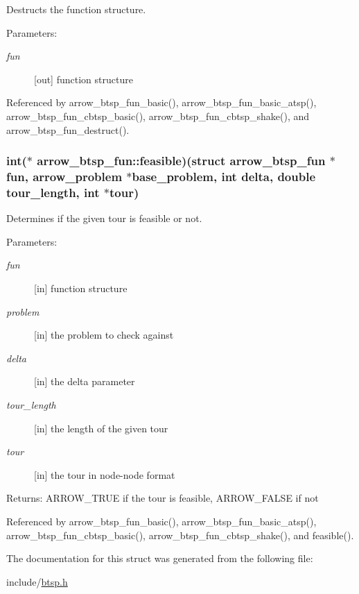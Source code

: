 Destructs the function structure. 

\begin{Desc}
\item[Parameters:]
\begin{description}
\item[{\em fun}]\mbox{[}out\mbox{]} function structure \end{description}
\end{Desc}


Referenced by arrow\_\-btsp\_\-fun\_\-basic(), arrow\_\-btsp\_\-fun\_\-basic\_\-atsp(), arrow\_\-btsp\_\-fun\_\-cbtsp\_\-basic(), arrow\_\-btsp\_\-fun\_\-cbtsp\_\-shake(), and arrow\_\-btsp\_\-fun\_\-destruct().\hypertarget{structarrow__btsp__fun_39eb61a5ad9a5786e773cce4affd2150}{
\subsubsection{\setlength{\rightskip}{0pt plus 5cm}int($\ast$ {\bf arrow\_\-btsp\_\-fun::feasible})(struct {\bf arrow\_\-btsp\_\-fun} $\ast$fun, {\bf arrow\_\-problem} $\ast$base\_\-problem, int delta, double tour\_\-length, int $\ast$tour)}}
\label{structarrow__btsp__fun_39eb61a5ad9a5786e773cce4affd2150}


Determines if the given tour is feasible or not. 

\begin{Desc}
\item[Parameters:]
\begin{description}
\item[{\em fun}]\mbox{[}in\mbox{]} function structure \item[{\em problem}]\mbox{[}in\mbox{]} the problem to check against \item[{\em delta}]\mbox{[}in\mbox{]} the delta parameter \item[{\em tour\_\-length}]\mbox{[}in\mbox{]} the length of the given tour \item[{\em tour}]\mbox{[}in\mbox{]} the tour in node-node format \end{description}
\end{Desc}
\begin{Desc}
\item[Returns:]ARROW\_\-TRUE if the tour is feasible, ARROW\_\-FALSE if not \end{Desc}


Referenced by arrow\_\-btsp\_\-fun\_\-basic(), arrow\_\-btsp\_\-fun\_\-basic\_\-atsp(), arrow\_\-btsp\_\-fun\_\-cbtsp\_\-basic(), arrow\_\-btsp\_\-fun\_\-cbtsp\_\-shake(), and feasible().

The documentation for this struct was generated from the following file:\begin{CompactItemize}
\item 
include/\hyperlink{btsp_8h}{btsp.h}\end{CompactItemize}
